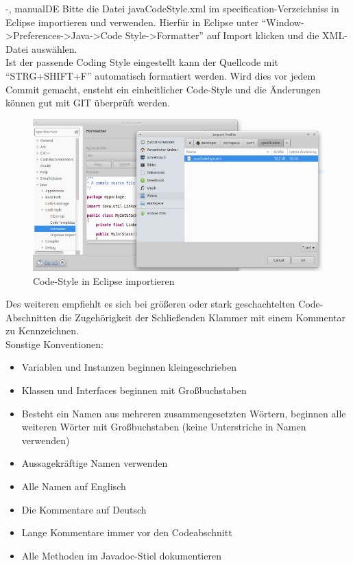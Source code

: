 \documentclass[twoside]{report}
\begin{document}
\begin{shownto}{-, manualDE}
Bitte die Datei javaCodeStyle.xml im specification-Verzeichniss in Eclipse importieren und verwenden.
Hierfür in Eclipse unter "`Window->Preferences->Java->Code Style->Formatter"' auf Import klicken und die XML-Datei auswählen.\\
Ist der passende Coding Style eingestellt kann der Quellcode mit "`STRG+SHIFT+F"' automatisch formatiert werden.
Wird dies vor jedem Commit gemacht, ensteht ein einheitlicher Code-Style und die Änderungen können gut mit GIT überprüft werden.\\
\begin{figure}[hbtp]
\centering
\includegraphics[scale=0.5]{Bilder/importCodeStyle}
\caption{Code-Style in Eclipse importieren}
\end{figure}
Des weiteren empfiehlt es sich bei größeren oder stark geschachtelten Code-Abschnitten die Zugehörigkeit der Schließenden Klammer mit einem Kommentar zu Kennzeichnen.\\
Sonstige Konventionen:
\begin{itemize}
\item{Variablen und Instanzen beginnen kleingeschrieben}
\item{Klassen und Interfaces beginnen mit Großbuchstaben}
\item{Besteht ein Namen aus mehreren zusammengesetzten Wörtern, beginnen alle weiteren Wörter mit Großbuchstaben (keine Unterstriche in Namen verwenden)}
\item{Aussagekräftige Namen verwenden}
\item{Alle Namen auf Englisch}
\item{Die Kommentare auf Deutsch}
\item{Lange Kommentare immer vor den Codeabschnitt}
\item{Alle Methoden im Javadoc-Stiel dokumentieren}
\end{itemize}
\nsecend


\end{shownto}
\end{document}
